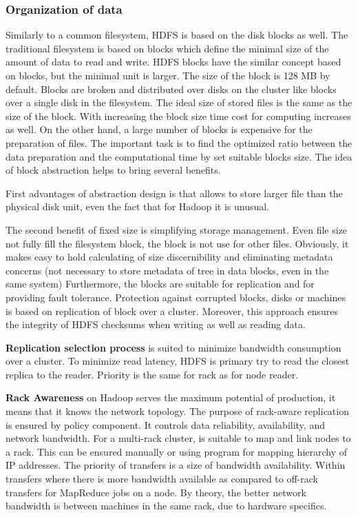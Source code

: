 \documentclass[a4paper,12pt,oneside]{report}
\begin{document}
	\subsubsection{Organization of data}
	Similarly to  a common filesystem, HDFS is based on the disk blocks as well. The
	traditional
	filesystem is based on blocks which define the minimal size of the amount of
	data to read and write.
	HDFS blocks have the similar concept based on blocks, but the minimal unit is
	larger. The size of the block is 128 MB by default. Blocks are broken and
	distributed
	over disks on the cluster like blocks over a single disk in the filesystem. The
	ideal 
	size of stored files is the same as the size of the block. With increasing the
	block 
	size time cost for computing increases as well. On the other hand, a large
	number
	of blocks is expensive for the preparation of files. The important task is to
	find the optimized 
	ratio between the data preparation and the computational time by set suitable
	blocks size.
	The idea of block abstraction helps to bring several benefits.
	
	First advantages of
	abstraction design is that allows to store larger file than the physical disk
	unit, 
	even the fact that for Hadoop it is unusual.
	
	The second benefit of fixed size is simplifying storage management. Even file
	size not fully fill the filesystem block, the block is not use for other files. 
	Obviously, it makes easy 
	to hold calculating of size discernibility and eliminating metadata concerns
	(not necessary 
	to store metadata of tree in data blocks, even in the same system)
	Furthermore, the blocks are suitable for replication and for providing fault
	tolerance. Protection
	against corrupted blocks, disks or machines is based on replication of block
	over a cluster. 
	Moreover, this approach ensures the integrity of HDFS checksums when writing as
	well as reading data.
	
	\textbf{Replication selection process} is suited to minimize bandwidth
	consumption over a cluster. 
	To minimize read latency, HDFS is primary try to read the closest replica to the
	reader. Priority is the 
	same for rack as for node reader. \cite{hadoop_hdfs_web}
	
	\textbf{Rack Awareness} on Hadoop serves the maximum potential of production, 
	it means that it knows the network topology. The purpose of rack-aware
	replication is ensured by policy 
	component. It controls data reliability, availability, and network bandwidth.
	For a multi-rack cluster, is suitable to map and link
	nodes to a rack\cite{hadoop_rack_web}. This can be ensured manually or using
	program for mapping hierarchy of IP 
	addresses. The priority of transfers is a size of bandwidth availability. Within
	transfers 
	where there is more bandwidth available as compared to off-rack transfers for
	MapReduce jobs on a node. 
	By theory, the better network bandwidth is between machines in the same rack,
	due to hardware specifics.
	
\end{document}
